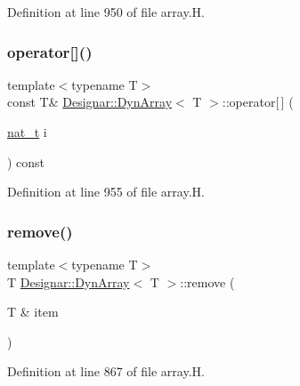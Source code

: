 Definition at line 950 of file array.\+H.

\mbox{\label{class_designar_1_1_dyn_array_af329e06efe69cb53e9d1a44a1ed0beeb}} 
\subsubsection{\texorpdfstring{operator[]()}{operator[]()}\hspace{0.1cm}{\footnotesize\ttfamily [2/2]}}
{\footnotesize\ttfamily template$<$typename T$>$ \\
const T\& \hyperlink{class_designar_1_1_dyn_array}{Designar\+::\+Dyn\+Array}$<$ T $>$\+::operator\mbox{[}$\,$\mbox{]} (\begin{DoxyParamCaption}\item[{\hyperlink{namespace_designar_aa72662848b9f4815e7bf31a7cf3e33d1}{nat\+\_\+t}}]{i }\end{DoxyParamCaption}) const\hspace{0.3cm}{\ttfamily [inline]}}



Definition at line 955 of file array.\+H.

\mbox{\label{class_designar_1_1_dyn_array_a989a057758da83805138d432d1d4c164}} 
\subsubsection{\texorpdfstring{remove()}{remove()}}
{\footnotesize\ttfamily template$<$typename T$>$ \\
T \hyperlink{class_designar_1_1_dyn_array}{Designar\+::\+Dyn\+Array}$<$ T $>$\+::remove (\begin{DoxyParamCaption}\item[{T \&}]{item }\end{DoxyParamCaption})\hspace{0.3cm}{\ttfamily [inline]}}



Definition at line 867 of file array.\+H.

\mbox{\label{class_designar_1_1_dyn_array_a86705ec7e30d0a2f5650baf34dd702d2}} 

